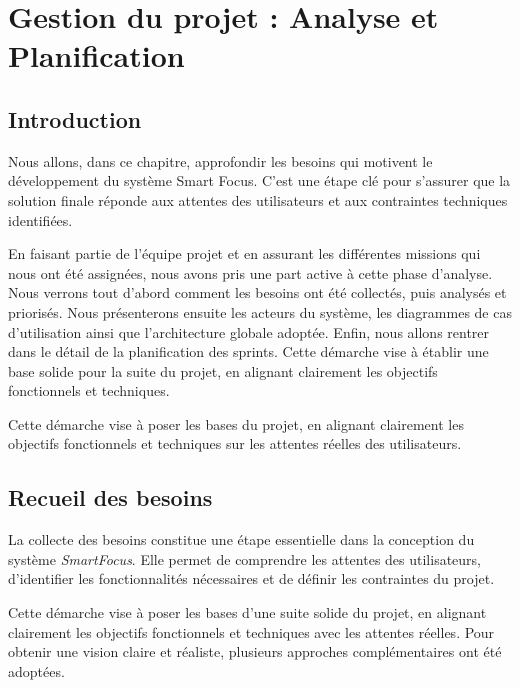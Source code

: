 
\chapter{Gestion du projet : Analyse et Planification}

\section{Introduction}
Nous allons, dans ce chapitre, approfondir les besoins qui motivent le développement du système Smart Focus. C’est une étape clé pour s’assurer que la solution finale réponde aux attentes des utilisateurs et aux contraintes techniques identifiées.

En faisant partie de l’équipe projet et en assurant les différentes missions qui nous ont été assignées, nous avons pris une part active à cette phase d’analyse. Nous verrons tout d’abord comment les besoins ont été collectés, puis analysés et priorisés. Nous présenterons ensuite les acteurs du système, les diagrammes de cas d’utilisation ainsi que l’architecture globale adoptée. Enfin, nous allons rentrer dans le détail de la planification des sprints. Cette démarche vise à établir une base solide pour la suite du projet, en alignant clairement les objectifs fonctionnels et techniques.

Cette démarche vise à poser les bases du projet, en alignant clairement les objectifs fonctionnels et techniques sur les attentes réelles des utilisateurs.
\section{Recueil des besoins}

La collecte des besoins constitue une étape essentielle dans la conception du système \textit{SmartFocus}. Elle permet de comprendre les attentes des utilisateurs, d’identifier les fonctionnalités nécessaires et de définir les contraintes du projet.

Cette démarche vise à poser les bases d’une suite solide du projet, en alignant clairement les objectifs fonctionnels et techniques avec les attentes réelles. Pour obtenir une vision claire et réaliste, plusieurs approches complémentaires ont été adoptées.
